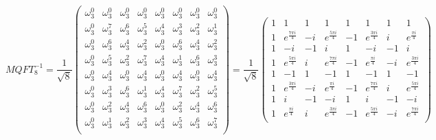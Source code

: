\documentclass{article}
\begin{document}
\[
MQFT_8^{-1} = \frac{1}{\sqrt{8}} \begin{pmatrix} 
\omega_3^{0}  & \omega_3^{0}  & \omega_3^{0}  & \omega_3^{0}  & \omega_3^{0}  & \omega_3^{0}  & \omega_3^{0}  & \omega_3^{0} \\ 
\omega_3^{0}  & \omega_3^{7}  & \omega_3^{6}  & \omega_3^{5}  & \omega_3^{4}  & \omega_3^{3}  & \omega_3^{2}  & \omega_3^{1} \\ 
\omega_3^{0}  & \omega_3^{6}  & \omega_3^{4}  & \omega_3^{2}  & \omega_3^{0}  & \omega_3^{6}  & \omega_3^{4}  & \omega_3^{2} \\ 
\omega_3^{0}  & \omega_3^{5}  & \omega_3^{2}  & \omega_3^{7}  & \omega_3^{4}  & \omega_3^{1}  & \omega_3^{6}  & \omega_3^{3} \\
\omega_3^{0}  & \omega_3^{4}  & \omega_3^{0}  & \omega_3^{4}  & \omega_3^{0}  & \omega_3^{4}  & \omega_3^{0}  & \omega_3^{4} \\ 
\omega_3^{0}  & \omega_3^{3}  & \omega_3^{6}  & \omega_3^{1}  & \omega_3^{4}  & \omega_3^{7}  & \omega_3^{2}  & \omega_3^{5} \\ 
\omega_3^{0}  & \omega_3^{2}  & \omega_3^{4}  & \omega_3^{6}  & \omega_3^{0}  & \omega_3^{2}  & \omega_3^{4}  & \omega_3^{6} \\ 
\omega_3^{0}  & \omega_3^{1}  & \omega_3^{2}  & \omega_3^{3}  & \omega_3^{4}  & \omega_3^{5}  & \omega_3^{6}  & \omega_3^{7} \\ 
\end{pmatrix} = 
\frac{1}{\sqrt{8}} \begin{pmatrix} 
1  & 1  & 1  & 1  & 1  & 1  & 1  & 1 \\ 
1  & e^{\frac{7 \pi  i}{4}}  & -i  & e^{\frac{5 \pi  i}{4}}  & -1  & e^{\frac{3 \pi  i}{4}}  & i  & e^{\frac{\pi  i}{4}} \\ 
1  & -i  & -1  & i  & 1  & -i  & -1  & i \\ 
1  & e^{\frac{5 \pi  i}{4}}  & i  & e^{\frac{7 \pi  i}{4}}  & -1  & e^{\frac{\pi  i}{4}}  & -i  & e^{\frac{3 \pi  i}{4}} \\
1  & -1  & 1  & -1  & 1  & -1  & 1  & -1 \\ 
1  & e^{\frac{3 \pi  i}{4}}  & -i  & e^{\frac{\pi  i}{4}}  & -1  & e^{\frac{7 \pi  i}{4}}  & i  & e^{\frac{5 \pi  i}{4}} \\ 
1  & i  & -1  & -i  & 1  & i  & -1  & -i \\ 
1  & e^{\frac{\pi  i}{4}}  & i  & e^{\frac{3 \pi  i}{4}}  & -1  & e^{\frac{5 \pi  i}{4}}  & -i  & e^{\frac{7 \pi  i}{4}} \\  
\end{pmatrix}\]
\end{document}
